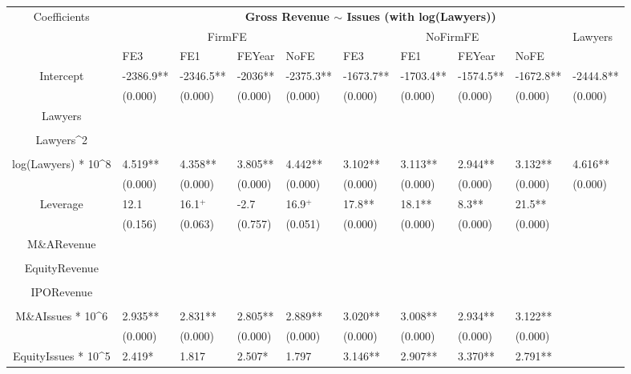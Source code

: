 \documentclass{article}
\begin{document}
\begin{table}[H]
\centering
\begin{tabular}{|clllllllll|}
\hline
\multirow{3}{*}{Coefficients} & \multicolumn{9}{c|}{\textbf{Gross Revenue $\sim$ Issues (with log(Lawyers))}} \\
\cline{2-10}
& \multicolumn{4}{c}{FirmFE} & \multicolumn{4}{c}{NoFirmFE} & \multirow{2}{*}{Lawyers} \\
\cline{2-9}
& FE3 & FE1 & FEYear & NoFE & FE3 & FE1 & FEYear & NoFE &  \\
\hline
 
Intercept & -2386.9** & -2346.5** & -2036** & -2375.3** & -1673.7** & -1703.4** & -1574.5** & -1672.8** & -2444.8** \\ 
   & (0.000) & (0.000) & (0.000) & (0.000) & (0.000) & (0.000) & (0.000) & (0.000) & (0.000) \\ 
  Lawyers &  &  &  &  &  &  &  &  &  \\ 
   &  &  &  &  &  &  &  &  &  \\ 
  Lawyers^2 &  &  &  &  &  &  &  &  &  \\ 
   &  &  &  &  &  &  &  &  &  \\ 
  log(Lawyers) * 10^8 & 4.519** & 4.358** & 3.805** & 4.442** & 3.102** & 3.113** & 2.944** & 3.132** & 4.616** \\ 
   & (0.000) & (0.000) & (0.000) & (0.000) & (0.000) & (0.000) & (0.000) & (0.000) & (0.000) \\ 
  Leverage & 12.1 & 16.1$^{+}$ & -2.7 & 16.9$^{+}$ & 17.8** & 18.1** & 8.3** & 21.5** &  \\ 
   & (0.156) & (0.063) & (0.757) & (0.051) & (0.000) & (0.000) & (0.000) & (0.000) &  \\ 
  M\&ARevenue &  &  &  &  &  &  &  &  &  \\ 
   &  &  &  &  &  &  &  &  &  \\ 
  EquityRevenue &  &  &  &  &  &  &  &  &  \\ 
   &  &  &  &  &  &  &  &  &  \\ 
  IPORevenue &  &  &  &  &  &  &  &  &  \\ 
   &  &  &  &  &  &  &  &  &  \\ 
  M\&AIssues * 10^6 & 2.935** & 2.831** & 2.805** & 2.889** & 3.020** & 3.008** & 2.934** & 3.122** &  \\ 
   & (0.000) & (0.000) & (0.000) & (0.000) & (0.000) & (0.000) & (0.000) & (0.000) &  \\ 
  EquityIssues * 10^5 & 2.419* & 1.817 & 2.507* & 1.797 & 3.146** & 2.907** & 3.370** & 2.791** &  \\ 

\end{tabular}
\end{table}
\end{document}
